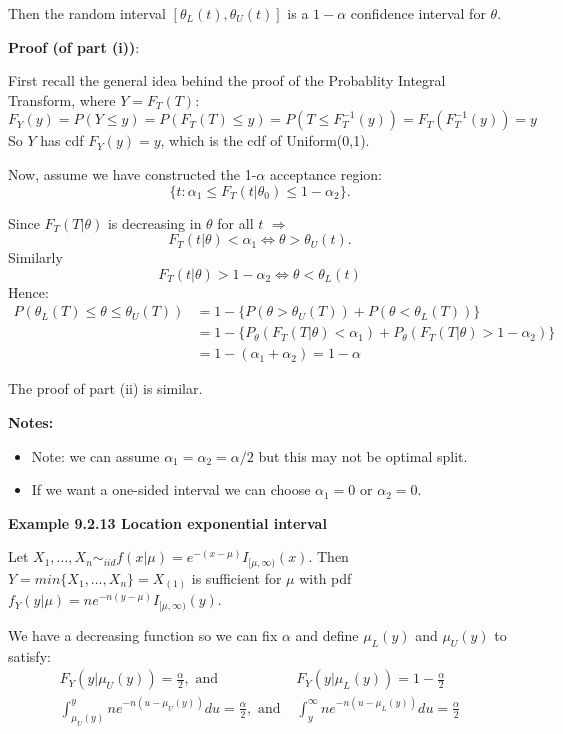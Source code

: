 \documentclass[11pt,]{article}
\newcommand{\Xndots}{X_1, \ldots, X_n}
\begin{document}
Then the random interval \([\theta_{L}(t),\theta_{U}(t)]\) is a
\(1-\alpha\) confidence interval for \(\theta\).

\noindent\textbf{Proof (of part (i))}:

First recall the general idea behind the proof of the Probablity
Integral Transform, where \(Y= F_T(T)\):
\[F_Y(y) = P(Y\leq y) = P(F_T(T) \leq y) = P(T \leq F_T^{-1}(y)) = F_T(F_T^{-1}(y)) = y\]
So \(Y\) has cdf \(F_Y(y) = y\), which is the cdf of Uniform(0,1).

Now, assume we have constructed the 1-\(\alpha\) acceptance region:
\[\{t: \alpha_1 \leq F_T(t|\theta_0) \leq 1 - \alpha_2\}.\]

Since \(F_T(T|\theta)\) is decreasing in \(\theta\) for all \(t\)
\(\Rightarrow\)
\[F_T(t|\theta) < \alpha_1 \Leftrightarrow \theta > \theta_U(t).\]
Similarly
\[F_T(t|\theta) > 1 - \alpha_2 \Leftrightarrow \theta < \theta_L(t)\]
Hence: \begin{align*}
P(\theta_L(T) \leq \theta \leq \theta_U(T)) & = 1 - \{ P(\theta > \theta_U(T)) + P(\theta < \theta_L(T))\}\\
&= 1 - \{P_\theta(F_T(T|\theta) < \alpha_1) + P_\theta(F_T(T|\theta) > 1- \alpha_2)\}\\
&= 1 - (\alpha_1 + \alpha_2) = 1- \alpha
\end{align*}

The proof of part (ii) is similar.

\textbf{Notes:}

\begin{itemize}
\item Note: we can assume $\alpha_1 = \alpha_2 = \alpha/2$ but this may not be optimal split.
\item If we want a one-sided interval we can choose $\alpha_1 = 0$ or $\alpha_2 = 0$.
\end{itemize}

\noindent\textbf{Example 9.2.13 Location exponential interval}

Let \(\Xndots \sim_{iid} f(x|\mu) = e^{-(x-\mu)}I_{[\mu,\infty)}(x).\)
Then \(Y = min\{\Xndots\} = X_{(1)}\) is sufficient for \(\mu\) with pdf
\(f_Y(y|\mu) = ne^{-n(y-\mu)} I_{[\mu,\infty)}(y).\)

We have a decreasing function so we can fix \(\alpha\) and define
\(\mu_L(y)\) and \(\mu_U(y)\) to satisfy: \begin{align*}
F_Y(y|\mu_U(y)) = \frac{\alpha}{2}, \mbox{ and }&  F_Y(y|\mu_L(y)) = 1-  \frac{\alpha}{2}\\
\int_{\mu_U(y)}^y ne^{-n(u - \mu_U (y))} du  = \frac{\alpha}{2}, \mbox{ and }&  
\int_{y}^\infty ne^{-n(u - \mu_L (y))} du  = \frac{\alpha}{2}
\end{align*}
\end{document}
